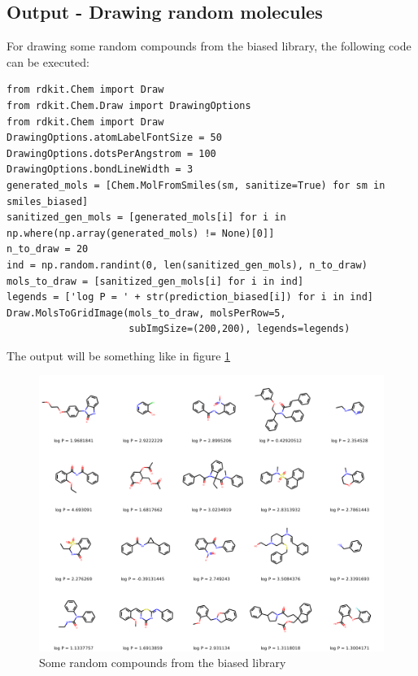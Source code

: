\documentclass[a4paper]{article}
\begin{document}
\subsection{Output - Drawing random molecules}\label{sec:Output - Drawing random molecules}

For drawing some random compounds from the biased library, the following code can be executed:

\begin{lstlisting}
from rdkit.Chem import Draw
from rdkit.Chem.Draw import DrawingOptions
from rdkit.Chem import Draw
DrawingOptions.atomLabelFontSize = 50
DrawingOptions.dotsPerAngstrom = 100
DrawingOptions.bondLineWidth = 3
generated_mols = [Chem.MolFromSmiles(sm, sanitize=True) for sm in smiles_biased]
sanitized_gen_mols = [generated_mols[i] for i in np.where(np.array(generated_mols) != None)[0]]
n_to_draw = 20
ind = np.random.randint(0, len(sanitized_gen_mols), n_to_draw)
mols_to_draw = [sanitized_gen_mols[i] for i in ind]
legends = ['log P = ' + str(prediction_biased[i]) for i in ind]
Draw.MolsToGridImage(mols_to_draw, molsPerRow=5, 
                     subImgSize=(200,200), legends=legends)
\end{lstlisting}

The output will be something like in figure \ref{fig:output}

\begin{figure}[htbp]
    \centering
        \includegraphics[width=\textwidth]{output.png}
		\caption{Some random compounds from the biased library}
    \label{fig:output}
\end{figure}
\end{document}
